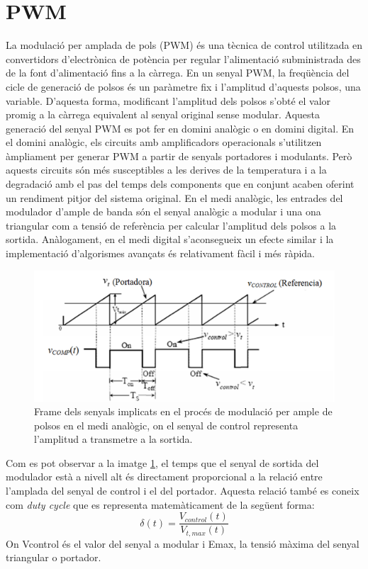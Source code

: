 \section{PWM}
\par La modulació per amplada de pols (PWM) és una tècnica de control utilitzada en convertidors d'electrònica de potència per regular l'alimentació subministrada des de la font d'alimentació fins a la càrrega. En un senyal PWM, la freqüència del cicle de generació de polsos és un paràmetre fix i l'amplitud d'aquests polsos, una variable. D'aquesta forma, modificant l'amplitud dels polsos s'obté el valor promig a la càrrega equivalent al senyal original sense modular. Aquesta generació del senyal PWM es pot fer en domini analògic o en domini digital. En el domini analògic, els circuits amb amplificadors operacionals s'utilitzen àmpliament per generar PWM a partir de senyals portadores i modulants. Però aquests circuits són més susceptibles a les derives de la temperatura i a la degradació amb el pas del temps dels components que en conjunt acaben oferint un rendiment pitjor del sistema original. En el medi analògic, les entrades del modulador d'ample de banda són el senyal analògic a modular i una ona triangular com a tensió de referència per calcular l'amplitud dels polsos a la sortida. Anàlogament, en el medi digital s'aconsegueix un efecte similar i la implementació d'algorismes avançats és relativament fàcil i més ràpida. \cite{PWMarticle} 
\begin{figure}[H]
    \centering
    \includegraphics[width=0.5\linewidth]{Images/PWM_Pique.png}
    \caption{Frame dels senyals implicats en el procés de modulació per ample de polsos en el medi analògic, on el senyal de control representa l'amplitud a transmetre a la sortida. \cite{PiquePWR}}
    \label{PWM_analog_fig}
\end{figure}
\par Com es pot observar a la imatge \ref{PWM_analog_fig}, el temps que el senyal de sortida del modulador està a nivell alt és directament proporcional a la relació entre l'amplada del senyal de control i el del portador. Aquesta relació també es coneix com \textit{duty cycle} que es representa matemàticament de la següent forma:
\begin{equation}\label{duty_eq}
    \delta(t) = \frac{V_{control}(t)}{V_{t,max}(t)}
\end{equation}
On Vcontrol és el valor del senyal a modular i Emax, la tensió màxima del senyal triangular o portador.

